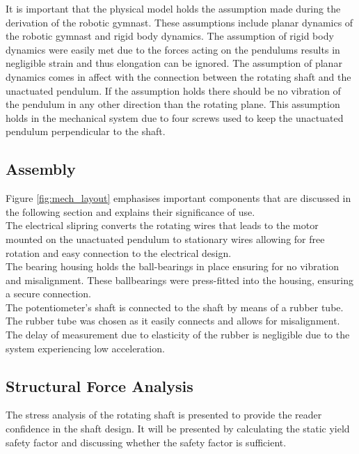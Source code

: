 It is important that the physical model holds the assumption made during the derivation of the robotic gymnast. These assumptions include planar dynamics of the robotic gymnast and rigid body dynamics. The assumption of rigid body dynamics were easily met due to the forces acting on the pendulums results in negligible strain and thus elongation can be ignored. The assumption of planar dynamics comes in affect with the connection between the rotating shaft and the unactuated pendulum. If the assumption holds there should be no vibration of the pendulum in any other direction than the rotating plane. This assumption holds in the mechanical system due to four screws used to keep the unactuated pendulum perpendicular to the shaft. \\

\subsection{Assembly}
Figure \ref{fig:mech_layout} emphasises important components that are discussed in the following section and explains their significance of use.\\	

The electrical slipring converts the rotating wires that leads to the motor mounted on the unactuated pendulum to stationary wires allowing for free rotation and easy connection to the electrical design.\\

The bearing housing holds the ball-bearings in place ensuring for no vibration and misalignment. These ballbearings were press-fitted into the housing, ensuring a secure connection.\\

The potentiometer's shaft is connected to the shaft by means of a rubber tube. The rubber tube was chosen as it easily connects and allows for misalignment. The delay of measurement due to elasticity of the rubber is negligible due to the system experiencing low acceleration. \\


\subsection{Structural Force Analysis}
The stress analysis of the rotating shaft is presented to provide the reader confidence in the shaft design. It will be presented by calculating the static yield safety factor and discussing whether the safety factor is sufficient.\\

